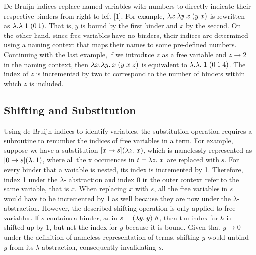 \documentclass[fleqn, 11pt]{article}
\begin{document}
De Bruijn indices replace named variables with numbers to directly indicate their respective binders from right to left [1]. For example, 
$\lambda x . \lambda y \hspace{1mm} x \hspace{1mm} (y \hspace{1mm} x)$ is rewritten as $\lambda . \lambda \hspace{1mm} 1 \hspace{1mm} (0 \hspace{1mm} 1)$. 
That is, $y$ is bound by the first binder and $x$ by the second. On the other hand, since free variables have no binders, their indices are 
determined using a naming context that maps their names to some pre-defined numbers. Continuing with the last example, if we introduce 
$z$ as a free variable and $z \rightarrow 2$ in the naming context, then 
$\lambda x . \lambda y . \hspace{1mm} x \hspace{1mm} (y \hspace{1mm} x \hspace{1mm} z)$ is equivalent to 
$\lambda . \lambda . \hspace{1mm} 1 \hspace{1mm} (0 \hspace{1mm} 1 \hspace{1mm} 4)$. The index of $z$ is incremented by two to correspond 
to the number of binders within which $z$ is included.

\subsection{Shifting and Substitution}

Using de Bruijn indices to identify variables, the substitution operation requires a subroutine to renumber the indices of free variables 
in a term. For example, suppose we have a substitution $[x\rightarrow s](\lambda z. \hspace{1mm} x)$, 
which is namelessly represented as $[0\rightarrow s](\lambda . \hspace{1mm} 1)$, where all the x occurences in $t = \lambda z . \hspace{1mm} x$ 
are replaced with $s$. For every binder that a variable is nested, its index is incremented by 1. Therefore, index 1 under the $\lambda$-
abstraction and index 0 in the outer context refer to the same variable, that is $x$. When replacing $x$ with $s$, all the free variables 
in $s$ would have to be incremented by 1 as well because they are now under the $\lambda$-abstraction. However, the described shifting 
operation is only applied to free variables. If $s$ contains a binder, as in $s = (\lambda y . \hspace{1mm} y) \hspace{1mm} h$, then 
the index for $h$ is shifted up by 1, but not the index for $y$ because it is bound. Given that $y \rightarrow 0$ under the definition of 
nameless representation of terms, shifting $y$ would unbind $y$ from its $\lambda$-abstraction, consequently invalidating $s$.
\end{document}

